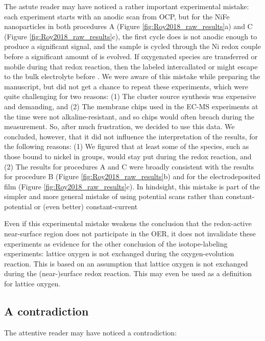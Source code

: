 The astute reader may have noticed a rather important experimental mistake: each experiment starts with an anodic scan from OCP, but for the NiFe nanoparticles in both procedures A (Figure \ref{fig:Roy2018_raw_results}a) and C (Figure \ref{fig:Roy2018_raw_results}c), the first cycle does is not anodic enough to produce a significant  signal, and the sample is cycled through the Ni redox couple before a significant amount of  is evolved. If oxygenated species are transferred or mobile during that redox reaction, then the labeled intercallated  or  might escape to the bulk electrolyte before . We were aware of this mistake while preparing the manuscript, but did not get a chance to repeat these experiments, which were quite challenging for two reasons: (1) The cluster source synthesis was expensive and demanding, and (2) The membrane chips used in the EC-MS experiments at the time were not alkaline-resistant, and so chips would often breach during the measurement. So, after much frustration, we decided to use this data. We concluded, however, that it did not influence the interpretation of the results, for the following reasons: (1) We figured that at least some of the  species, such as those bound to nickel in  groups, would stay put during the redox reaction, and (2) The results for procedures A and C were broadly consistent with the results for procedure B (Figure \ref{fig:Roy2018_raw_results}b) and for the electrodeposited film (Figure \ref{fig:Roy2018_raw_results}c). In hindsight, this mistake is part of the simpler and more general mistake of using potential scans rather than constant-potential or (even better) constant-current

Even if this experimental mistake weakens the conclusion that the redox-active near-surface region does not participate in the OER, it does not invalidate these experiments as evidence for the other conclusion of the isotope-labeling experiments: lattice oxygen is not exchanged during the oxygen-evolution reaction. This is based on an assumption that lattice oxygen is not exchanged during the (near-)surface redox reaction. This may even be used as a definition for lattice oxygen.




\subsection{A contradiction}

The attentive reader may have noticed a contradiction:


